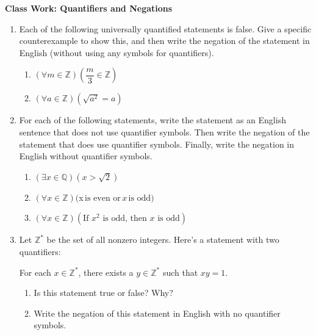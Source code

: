 \documentclass[11pt]{article}
\begin{document}
	
	\thispagestyle{empty}
	\renewcommand{\headrulewidth}{0.0pt}
	\thispagestyle{fancy}
	\lfoot{}
	\cfoot{}
	\rfoot{}	
	
	\vspace*{0in}

		\begin{center}
			\begin{large}
			\textbf{Class Work: Quantifiers and Negations} \\
			\end{large}
		\end{center}
		

\begin{enumerate}
	
	\item Each of the following universally quantified statements is false. Give a specific counterexample to show this, and then write the negation of the statement in English (without using any symbols for quantifiers). 
	\begin{enumerate}
		\item $(\forall m \in \mathbb{Z}) \left( \dfrac{m}{3} \in \mathbb{Z} \right)$
		\item $(\forall a \in \mathbb{Z})(\sqrt{a^2} = a)$
	\end{enumerate}
	
	
	\item For each of the following statements, write the statement as an English sentence that does not use quantifier symbols. Then write the negation of the statement that does use quantifier symbols. Finally, write the negation in English without quantifier symbols. 
	\begin{enumerate}
		\item $(\exists x \in \mathbb{Q})(x > \sqrt{2})$
		\item $(\forall x \in \mathbb{Z})($x$ \, \text{is even or} \, x \, \text{is odd})$
		\item $(\forall x \in \mathbb{Z})(\text{If $x^2$ is odd, then $x$ is odd})$
	\end{enumerate}
	
	\item Let $\mathbb{Z}^*$ be the set of all nonzero integers. Here's a statement with two quantifiers: 
	\begin{center}
		For each $x \in \mathbb{Z}^*$, there exists a $y \in \mathbb{Z}^*$ such that $xy = 1$. 
	\end{center}
	\begin{enumerate}
		\item Is this statement true or false? Why? 
		\item Write the negation of this statement in English with no quantifier symbols. 
	\end{enumerate}
	
	
\end{enumerate}
	
\end{document}
